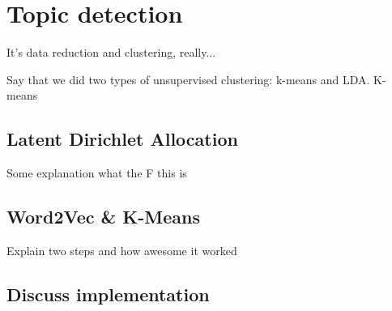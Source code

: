 \section{Topic detection}
\label{sec:topic_detection}
It's data reduction and clustering, really...

Say that we did two types of unsupervised clustering: k-means and LDA. K-means

\subsection{Latent Dirichlet Allocation}
Some explanation what the F this is

\lipsum[1]

\subsection{Word2Vec \& K-Means}
Explain two steps and how awesome it worked

\lipsum[1]

\subsection{Discuss implementation}
